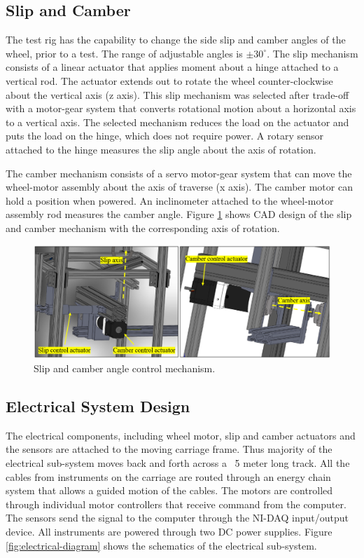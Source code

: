 \documentclass{article}
\begin{document}
\subsection{Slip and Camber}

The test rig has the capability to change the side slip and camber angles of the wheel, prior to a test. The range of adjustable angles is $\pm 30^\circ$. The slip mechanism consists of a linear actuator that applies moment about a hinge attached to a vertical rod. The actuator extends out to rotate the wheel counter-clockwise about the vertical axis (z axis). This slip mechanism was selected after trade-off with a motor-gear system that converts rotational motion about a horizontal axis to a vertical axis. The selected mechanism reduces the load on the actuator and puts the load on the hinge, which does not require power. A rotary sensor attached to the hinge measures the slip angle about the axis of rotation. 

The camber mechanism consists of a servo motor-gear system that can move the wheel-motor assembly about the axis of traverse (x axis). The camber motor can hold a position when powered. An inclinometer attached to the wheel-motor assembly rod measures the camber angle. Figure \ref{fig:slipcamber} shows CAD design of the slip and camber mechanism with the corresponding axis of rotation.  

\begin{figure}[hbt!]
\centering
\includegraphics[width=1\textwidth]{plots/slip_camber_mechanism.PNG}
\caption{Slip and camber angle control mechanism.}
\label{fig:slipcamber}
\end{figure}

\subsection{Electrical System Design}

The electrical components, including wheel motor, slip and camber actuators and the sensors are attached to the moving carriage frame. Thus majority of the electrical sub-system moves back and forth across a ~5 meter long track. All the cables from instruments on the carriage are routed through an energy chain system that allows a guided motion of the cables. The motors are controlled through individual motor controllers that receive command from the computer. The sensors send the signal to the computer through the NI-DAQ input/output device. All instruments are powered through two DC power supplies. Figure \ref{fig:electrical-diagram} shows the schematics of the electrical sub-system.  
\end{document}
